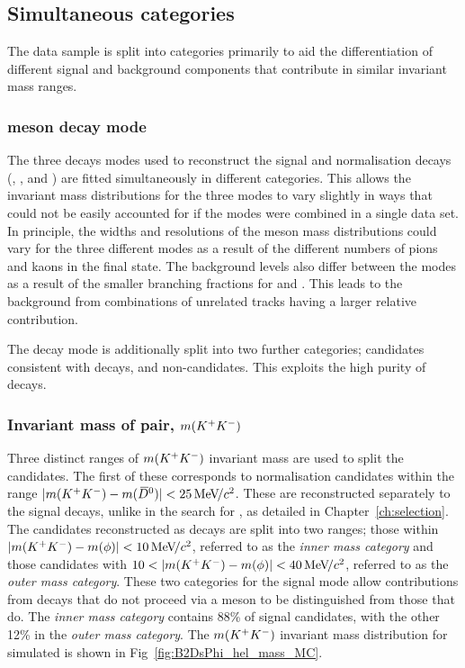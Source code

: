 \subsection{Simultaneous categories}
\label{sec:B2DsPhi_fit_cats}

The data sample is split into categories primarily to aid the differentiation of different signal and background components that contribute in similar invariant mass ranges.

\subsubsection{\Dsp meson decay mode} 
The three \Dsp decays modes used to reconstruct the signal and normalisation decays (\decay{\Dsp}{\Kp\Km\pip}, \decay{\Dsp}{\pip\pim\pip}, and \decay{\Dsp}{\Kp\pim\pip}) are fitted simultaneously in different categories. This allows the invariant mass distributions for the three modes to vary slightly in ways that could not be easily accounted for if the modes were combined in a single data set. In principle, the widths and resolutions of the \Bp meson mass distributions could vary for the three different modes as a result of the different numbers of pions and kaons in the final state. The background levels also differ between the modes as a result of the smaller branching fractions for \decay{\Dsp}{\pip\pim\pip} and \decay{\Dsp}{\Kp\pim\pip}. This leads to the background from combinations of unrelated tracks having a larger relative contribution.

The \decay{\Dsp}{\Kp\Km\pip} decay mode is additionally split into two further categories; candidates consistent with \decay{\Dsp}{\phiz\pip} decays, and non-\phiz candidates. This exploits the high purity of \decay{\Dsp}{\phiz\pip} decays. 

\subsubsection{Invariant mass of \Kp\Km pair, $m({{K}^+}{{K}^-})$} 
Three distinct ranges of $m({{K}^+}{{K}^-})$ invariant mass are used to split the candidates. The first of these corresponds to normalisation \decay{\Bp}{\Dsp\Dzb} candidates within the range $|m({{K}^+}{{K}^-})-m({{\kern 0.2em\overline{\kern -0.2em D}{}}{}^0})|<25 {\mathrm{\,Me\kern -0.1em V\!/}c^2}$. These are reconstructed separately to the signal decays, unlike in the search for \decay{\Bp}{\Dsp\Kp\Km}, as detailed in Chapter~\ref{ch:selection}. The candidates reconstructed as \decay{\Bp}{\Dsp\phiz} decays are split into two ranges; those within $|m({{K}^+}{{K}^-})-m(\phi)|<10{\mathrm{\,Me\kern -0.1em V\!/}c^2}$, referred to as the \emph{inner \phiz mass category} and those candidates with $10<|m(\Kp\Km)-m(\phiz)|<40\mevcc$, referred to as the \emph{outer \phiz mass category}. These two categories for the signal mode allow contributions from decays that do not proceed via a \phiz meson to be distinguished from those that do. The \emph{inner \phiz mass category} contains 88\% of signal \decay{\Bp}{\Dsp\phiz} candidates, with the other 12\% in the \emph{outer \phiz mass category}. The $m({{K}^+}{{K}^-})$ invariant mass distribution for simulated \decay{\Bp}{\Dsp\phiz} is shown in Fig~\ref{fig:B2DsPhi_hel_mass_MC}.



